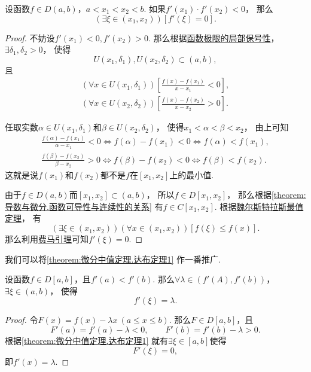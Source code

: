 \begin{theorem}[达布零点定理]\label{theorem:微分中值定理.达布定理1}
设函数\(f \in D(a,b)\)，\(a<x_1<x_2<b\).
如果\(f'(x_1) \cdot f'(x_2) < 0\)，
那么\[
	(\exists\xi\in(x_1,x_2))
	[f'(\xi) = 0].
\]
\begin{proof}
不妨设\(f'(x_1)<0,f'(x_2)>0\).
那么根据\hyperref[theorem:极限.函数极限的局部保号性1]{函数极限的局部保号性}，
\(\exists\delta_1,\delta_2>0\)，
使得\[
	U(x_1,\delta_1),U(x_2,\delta_2)\subset(a,b),
\]
且\[
	\begin{split}
		(\forall x \in U(x_1,\delta_1))
		\left[\frac{f(x)-f(x_1)}{x-x_1}<0\right], \\
		(\forall x \in U(x_2,\delta_2))
		\left[\frac{f(x)-f(x_2)}{x-x_2}>0\right].
	\end{split}
\]

任取实数\(\alpha \in U(x_1,\delta_1)\)和\(\beta \in U(x_2,\delta_2)\)，
使得\(x_1<\alpha<\beta<x_2\)，
由上可知\[
	\begin{split}
		\frac{f(\alpha)-f(x_1)}{\alpha-x_1}<0
		\iff
		f(\alpha)-f(x_1)<0
		\iff
		f(\alpha)<f(x_1), \\
		\frac{f(\beta)-f(x_2)}{\beta-x_2}>0
		\iff
		f(\beta)-f(x_2)<0
		\iff
		f(\beta)<f(x_2).
	\end{split}
\]
这就是说\(f(x_1)\)和\(f(x_2)\)都不是\(f\)在\([x_1,x_2]\)上的最小值.

由于\(f \in D(a,b)\)而\([x_1,x_2]\subset(a,b)\)，
所以\(f \in D[x_1,x_2]\)，
那么根据\cref{theorem:导数与微分.函数可导性与连续性的关系}
有\(f \in C[x_1,x_2]\).
根据\hyperref[theorem:极限.最值定理]{魏尔斯特拉斯最值定理}，
有\[
	(\exists\xi\in(x_1,x_2))
	(\forall x\in(x_1,x_2))
	[f(\xi) \leq f(x)].
\]
那么利用\hyperref[theorem:微分中值定理.费马引理]{费马引理}可知\(f'(\xi)=0\).
\end{proof}
\end{theorem}

我们可以将\cref{theorem:微分中值定理.达布定理1} 作一番推广.
\begin{theorem}[达布介值定理]\label{theorem:微分中值定理.达布定理2}
设函数\(f \in D[a,b]\)，且\(f'(a) < f'(b)\).
那么\(\forall\lambda\in(f'(A),f'(b))\)，\(\exists\xi\in(a,b)\)，
使得\[
	f'(\xi) = \lambda.
\]
\begin{proof}
令\(F(x) = f(x) - \lambda x\ (a \leq x \leq b)\).
那么\(F \in D[a,b]\)，且\[
	F'(a) = f'(a) - \lambda < 0, \qquad
	F'(b) = f'(b) - \lambda > 0.
\]
根据\cref{theorem:微分中值定理.达布定理1} 就有\(\exists\xi\in[a,b]\)使得\[
	F'(\xi)=0,
\]
即\(f'(x) = \lambda\).
\end{proof}
\end{theorem}

